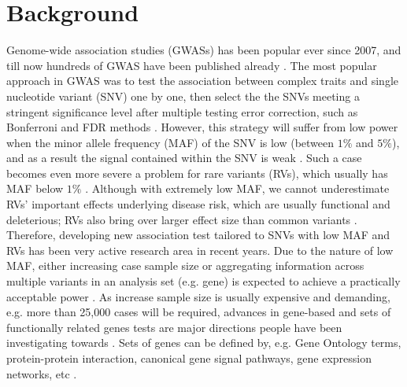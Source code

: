 \documentclass[12pt]{article}
\begin{document}
\newpage
\tableofcontents

\newpage
\listoftables

\newpage
\listoffigures
 

\newpage
\section{Background}\label{sec:background}
\doublespacing
Genome-wide association studies (GWASs) has been popular ever since 2007, and till now hundreds of GWAS have been published already \cite{McCarthy2008}. The most popular approach in GWAS was to test the association between complex traits and single nucleotide variant (SNV) one by one, then select the the SNVs meeting a stringent significance level after multiple testing error correction, such as Bonferroni and FDR methods \cite{McCarthy2008,Hirschhorn2005}. However, this strategy will suffer from low power when the minor allele frequency (MAF) of the SNV is low (between $1\%$ and $5\%$), and as a result the signal contained within the SNV is weak \cite{Sham2014}. Such a case becomes even more severe a problem for rare variants (RVs), which usually has MAF below $1\%$ \cite{Bansal2010}. Although with extremely low MAF, we cannot underestimate RVs' important effects underlying disease risk, which are usually functional and deleterious; RVs also bring over larger effect size than common variants \cite{Fu2013,Bansal2010,Sham2014,McCarthy2008}. Therefore, developing new association test tailored to SNVs with low MAF and RVs has been very active research area in recent years. Due to the nature of low MAF, either increasing case sample size or aggregating information across multiple variants in an analysis set (e.g. gene) is expected to achieve a practically acceptable power \cite{Capanu2011,Basu2011,Bansal2010,Sham2014}. As increase sample size is usually expensive and demanding, e.g. more than 25,000 cases will be required, advances in gene-based and sets of functionally related genes tests are major directions people have been investigating towards \cite{Ye2011,Pinto2010,Sham2014}. Sets of genes can be defined by, e.g. Gene Ontology terms, protein-protein interaction, canonical gene signal pathways, gene expression networks, etc \cite{Sham2014,DelaCruz2010,Weng2011,Wang2010}.
\end{document}
